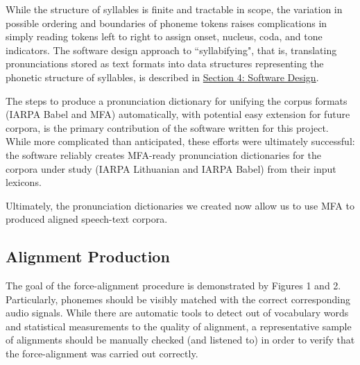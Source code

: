 \documentclass[11pt]{article}
\begin{document}
While the structure of syllables is finite and tractable in scope, the variation in possible ordering and boundaries of phoneme tokens raises complications in simply reading tokens left to right to assign onset, nucleus, coda, and tone indicators. The software design approach to ``syllabifying", that is, translating pronunciations stored as text formats into data structures representing the phonetic structure of syllables, is described in \hyperlink{section.4}{Section 4: Software Design}.

The steps to produce a pronunciation dictionary for unifying the corpus formats (IARPA Babel and MFA) automatically, with potential easy extension for future corpora, is the primary contribution of the software written for this project. While more complicated than anticipated, these efforts were ultimately successful: the software reliably creates MFA-ready pronunciation dictionaries for the corpora under study (IARPA Lithuanian and IARPA Babel) from their input lexicons. 

Ultimately, the pronunciation dictionaries  we created now allow us to use MFA to produced aligned speech-text corpora.

\subsection{Alignment Production}

The goal of the force-alignment procedure is demonstrated by Figures 1 and 2. Particularly, phonemes should be visibly matched with the correct corresponding audio signals. While there are automatic tools to detect out of vocabulary words and statistical measurements to the quality of alignment, a representative sample of alignments should be manually checked (and listened to) in order to verify that the force-alignment was carried out correctly.
\end{document}
